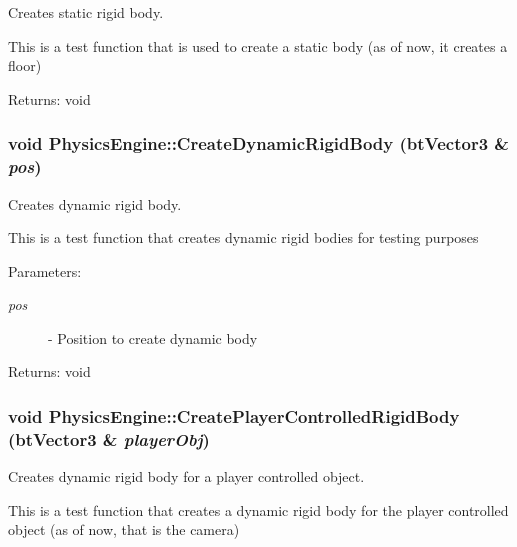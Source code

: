 Creates static rigid body. 

This is a test function that is used to create a static body (as of now, it creates a floor)

\begin{Desc}
\item[Returns:]void \end{Desc}
\hypertarget{class_physics_engine_549c7e9116d06e8f7599497c3c4f6fd1}{
\subsubsection[CreateDynamicRigidBody]{\setlength{\rightskip}{0pt plus 5cm}void PhysicsEngine::CreateDynamicRigidBody (btVector3 \& {\em pos})}}
\label{class_physics_engine_549c7e9116d06e8f7599497c3c4f6fd1}


Creates dynamic rigid body. 

This is a test function that creates dynamic rigid bodies for testing purposes

\begin{Desc}
\item[Parameters:]
\begin{description}
\item[{\em pos}]- Position to create dynamic body\end{description}
\end{Desc}
\begin{Desc}
\item[Returns:]void \end{Desc}
\hypertarget{class_physics_engine_6096d332305e50fba86f377c00ec27e0}{
\subsubsection[CreatePlayerControlledRigidBody]{\setlength{\rightskip}{0pt plus 5cm}void PhysicsEngine::CreatePlayerControlledRigidBody (btVector3 \& {\em playerObj})}}
\label{class_physics_engine_6096d332305e50fba86f377c00ec27e0}


Creates dynamic rigid body for a player controlled object. 

This is a test function that creates a dynamic rigid body for the player controlled object (as of now, that is the camera)

